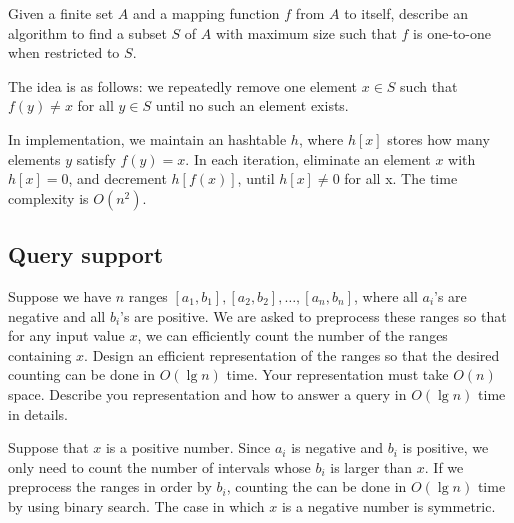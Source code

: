 \begin{Exercise}[origin={NCTU CSIE 91}]
Given a finite set $A$ and a mapping function $f$ from $A$ to itself, describe an algorithm to find a subset $S$ of $A$ with maximum size such that $f$ is one-to-one when restricted to $S$.
\end{Exercise}
\begin{Answer}
The idea is as follows: we repeatedly remove one element $x \in S$ such that $f(y) \neq x$ for all $y \in S$ until no such an element exists.

In implementation, we maintain an hashtable $h$, where $h[x]$ stores how many elements $y$ satisfy $f(y) = x$. In each iteration, eliminate an element $x$ with $h[x] = 0$, and decrement $h[f(x)]$, until $h[x] \neq 0$ for all x. The time complexity is $O(n^2)$.
\end{Answer}

\subsection{Query support}

\begin{Exercise}[origin={NTHU CSIE 100}]
Suppose we have $n$ ranges $[a_1, b_1], [a_2, b_2], \dots, [a_n, b_n]$, where all $a_i$'s are negative and all $b_i$'s are positive. We are asked to preprocess these ranges so that for any input value $x$, we can efficiently count the number of the ranges containing $x$. Design an efficient representation of the ranges so that the desired counting can be done in $O(\lg n)$ time. Your representation must take $O(n)$ space. Describe you representation and how to answer a query in $O(\lg n)$ time in details.
\end{Exercise}
\begin{Answer}
Suppose that $x$ is a positive number. Since $a_i$ is negative and $b_i$ is positive, we only need to count the number of intervals whose $b_i$ is larger than $x$. If we preprocess the ranges in order by $b_i$, counting the can be done in $O(\lg n)$ time by using binary search. The case in which $x$ is a negative number is symmetric.
\end{Answer}

